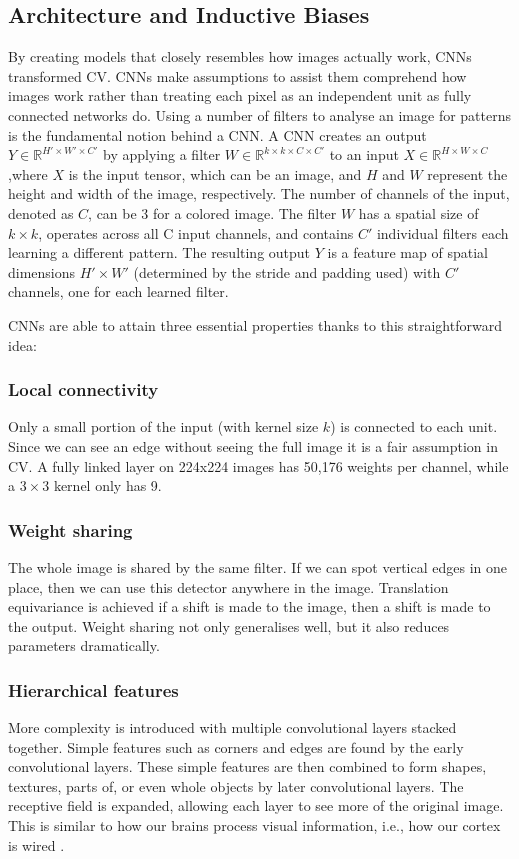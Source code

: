 \documentclass[english, LaM, oneside]{sapthesis}%
\numberwithin{equation}{chapter}
\begin{document}
\subsection{Architecture and Inductive Biases}
By creating models that closely resembles how images actually work, CNNs transformed CV. CNNs make assumptions to assist them comprehend how images work rather than treating each pixel as an independent unit as fully connected networks do.
Using a number of filters to analyse an image for patterns is the fundamental notion behind a CNN. A CNN creates an output $Y \in \mathbb{R}^{H' \times W' \times C'}$ by applying a filter $W \in \mathbb{R}^{k \times k \times C \times C'}$ to an input $X \in \mathbb{R}^{H \times W \times C}$,where $X$ is the input tensor, which can be an image, and $H$ and $W$ represent the height and width of the image, respectively. The number of channels of the input, denoted as $C$, can be 3 for a colored image.  The filter $W$ has a spatial size of $k\times k$, operates across all C input channels, and contains $C'$ individual filters each learning a different pattern. The resulting output $Y$ is a feature map of spatial dimensions $H'\times W'$ (determined by the stride and padding used) with $C'$ channels, one for each learned filter. 

CNNs are able to attain three essential properties thanks to this straightforward idea\cite{13}:
\subsubsection{Local connectivity}
Only a small portion of the input (with kernel size $k$) is connected to each unit. Since we can see an edge without seeing the full image it is a fair assumption in CV. A fully linked layer on 224x224 images has 50,176 weights per channel, while a $3\times 3$ kernel only has 9.
\subsubsection{Weight sharing}
The whole image is shared by the same filter. If we can spot vertical edges in one place, then we can use this detector anywhere in the image. Translation equivariance is achieved if a shift is made to the image, then a shift is made to the output. Weight sharing not only generalises well, but it also reduces parameters dramatically.
\subsubsection{Hierarchical features}
More complexity is introduced with multiple convolutional layers stacked together. Simple features such as corners and edges are found by the early convolutional layers. These simple features are then combined to form shapes, textures, parts of, or even whole objects by later convolutional layers. The receptive field is expanded, allowing each layer to see more of the original image. This is similar to how our brains process visual information, i.e., how our cortex is wired \cite{23}.
\end{document}
